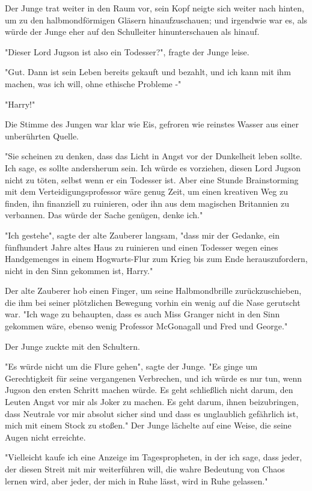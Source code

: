 {Der Junge trat weiter in den Raum vor, sein Kopf neigte sich weiter nach hinten, um zu den halbmondförmigen Gläsern hinaufzuschauen; und irgendwie war es, als würde der Junge eher auf den Schulleiter hinunterschauen als hinauf.

"Dieser Lord Jugson ist also ein Todesser?", fragte der Junge leise.

"Gut. Dann ist sein Leben bereits gekauft und bezahlt, und ich kann mit ihm machen, was ich will, ohne ethische Probleme -"

"Harry!"

Die Stimme des Jungen war klar wie Eis, gefroren wie reinstes Wasser aus einer unberührten Quelle.

"Sie scheinen zu denken, dass das Licht in Angst vor der Dunkelheit leben sollte. Ich sage, es sollte andersherum sein. Ich würde es vorziehen, diesen Lord Jugson nicht zu töten, selbst wenn er ein Todesser ist. Aber eine Stunde Brainstorming mit dem Verteidigungsprofessor wäre genug Zeit, um einen kreativen Weg zu finden, ihn finanziell zu ruinieren, oder ihn aus dem magischen Britannien zu verbannen. Das würde der Sache genügen, denke ich."

"Ich gestehe", sagte der alte Zauberer langsam, "dass mir der Gedanke, ein fünfhundert Jahre altes Haus zu ruinieren und einen Todesser wegen eines Handgemenges in einem Hogwarts-Flur zum Krieg bis zum Ende herauszufordern, nicht in den Sinn gekommen ist, Harry."

Der alte Zauberer hob einen Finger, um seine Halbmondbrille zurückzuschieben, die ihm bei seiner plötzlichen Bewegung vorhin ein wenig auf die Nase gerutscht war. "Ich wage zu behaupten, dass es auch Miss Granger nicht in den Sinn gekommen wäre, ebenso wenig Professor McGonagall und Fred und George."

Der Junge zuckte mit den Schultern.

"Es würde nicht um die Flure gehen", sagte der Junge. "Es ginge um Gerechtigkeit für seine vergangenen Verbrechen, und ich würde es nur tun, wenn Jugson den ersten Schritt machen würde. Es geht schließlich nicht darum, den Leuten Angst vor mir als Joker zu machen. Es geht darum, ihnen beizubringen, dass Neutrale vor mir absolut sicher sind und dass es unglaublich gefährlich ist, mich mit einem Stock zu stoßen." Der Junge lächelte auf eine Weise, die seine Augen nicht erreichte.

"Vielleicht kaufe ich eine Anzeige im Tagespropheten, in der ich sage, dass jeder, der diesen Streit mit mir weiterführen will, die wahre Bedeutung von Chaos lernen wird, aber jeder, der mich in Ruhe lässt, wird in Ruhe gelassen."

}
